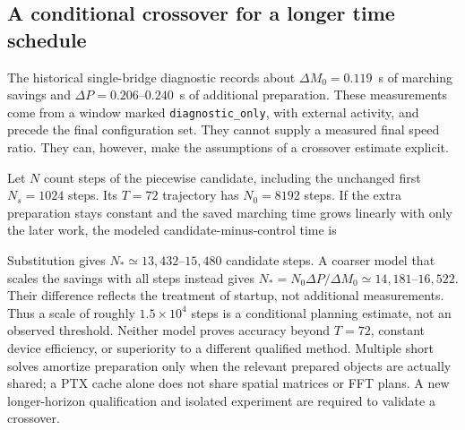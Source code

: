 \subsection{A conditional crossover for a longer time schedule}
\label{sec:schedule-amortization}

The historical single-bridge diagnostic records about $\Delta M_0=0.119$~s of marching savings and $\Delta P=0.206$--$0.240$~s of additional preparation. These measurements come from a window marked \texttt{diagnostic\_only}, with external activity, and precede the final configuration set. They cannot supply a measured final speed ratio. They can, however, make the assumptions of a crossover estimate explicit.

Let $N$ count steps of the piecewise candidate, including the unchanged first $N_s=1024$ steps. Its $T=72$ trajectory has $N_0=8192$ steps. If the extra preparation stays constant and the saved marching time grows linearly with only the later work, the modeled candidate-minus-control time is

Substitution gives $N_*\simeq13{,}432$--$15{,}480$ candidate steps. A coarser model that scales the savings with all steps instead gives $N_*=N_0\Delta P/\Delta M_0\simeq14{,}181$--$16{,}522$. Their difference reflects the treatment of startup, not additional measurements. Thus a scale of roughly $1.5\times10^4$ steps is a conditional planning estimate, not an observed threshold. Neither model proves accuracy beyond $T=72$, constant device efficiency, or superiority to a different qualified method. Multiple short solves amortize preparation only when the relevant prepared objects are actually shared; a PTX cache alone does not share spatial matrices or FFT plans. A new longer-horizon qualification and isolated experiment are required to validate a crossover.
